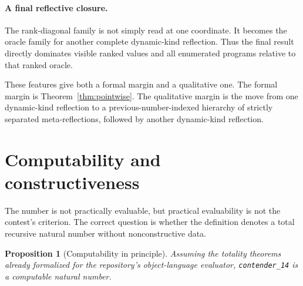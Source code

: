 \documentclass[11pt]{article}
\newtheorem{proposition}[theorem]{Proposition}
\theoremstyle{definition}
\theoremstyle{remark}
\newcommand{\lean}[1]{\texttt{#1}}
\begin{document}
\paragraph{A final reflective closure.}
The rank-diagonal family is not simply read at one coordinate.  It becomes the
oracle family for another complete dynamic-kind reflection.  Thus the final
result directly dominates visible ranked values and all enumerated programs
relative to that ranked oracle.

These features give both a formal margin and a qualitative one.  The formal
margin is Theorem~\ref{thm:pointwise}.  The qualitative margin is the move from
one dynamic-kind reflection to a previous-number-indexed hierarchy of
strictly separated meta-reflections, followed by another dynamic-kind
reflection.

\section{Computability and constructiveness}

The number is not practically evaluable, but practical evaluability is not the
contest's criterion.  The correct question is whether the definition denotes a
total recursive natural number without nonconstructive data.

\begin{proposition}[Computability in principle]
Assuming the totality theorems already formalized for the repository's
object-language evaluator, \lean{contender\_14} is a computable natural number.
\end{proposition}
\end{document}
